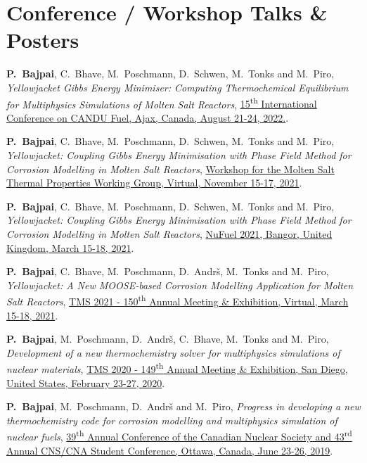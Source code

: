 \section*{Conference / Workshop Talks \& Posters}
\vspace*{1em}
\begin{enumerate}{\small\compresslist
    \item \textbf{P.\ Bajpai}, {C.\ Bhave}, {M.\ Poschmann}, {D.\ Schwen}, {M.\ Tonks} and {M.\ Piro}, \textit{Yellowjacket Gibbs Energy Minimiser: Computing Thermochemical Equilibrium for Multiphysics Simulations of Molten Salt Reactors}, \href{https://www.cns-snc.ca/event/2022-fuel-conference/}{15\textsuperscript{th} International Conference on CANDU Fuel, Ajax, Canada, August 21-24, 2022.}.
    \item \textbf{P.\ Bajpai}, {C.\ Bhave}, {M.\ Poschmann}, {D.\ Schwen}, {M.\ Tonks} and {M.\ Piro}, \textit{Yellowjacket: Coupling Gibbs Energy Minimisation with Phase Field Method for Corrosion Modelling in Molten Salt Reactors}, \href{}{Workshop for the Molten Salt Thermal Properties Working Group, Virtual, November 15-17, 2021}.
    \item \textbf{P.\ Bajpai}, {C.\ Bhave}, {M.\ Poschmann}, {D.\ Schwen}, {M.\ Tonks} and {M.\ Piro}, \textit{Yellowjacket: Coupling Gibbs Energy Minimisation with Phase Field Method for Corrosion Modelling in Molten Salt Reactors}, \href{https://nubu.nu/events/nufuel-workshop/}{NuFuel 2021, Bangor, United Kingdom, March 15-18, 2021}.
    \item \textbf{P.\ Bajpai}, {C.\ Bhave}, {M.\ Poschmann}, {D.\ Andr\v{s}}, {M.\ Tonks} and {M.\ Piro}, \textit{Yellowjacket: A New MOOSE‐based Corrosion Modelling Application for Molten Salt Reactors}, \href{https://www.tms.org/TMS2021}{TMS 2021  - 150\textsuperscript{th} Annual Meeting \& Exhibition, Virtual, March 15-18, 2021}.
    \item \textbf{P.\ Bajpai}, {M.\ Poschmann}, {D.\ Andr\v{s}}, {C.\ Bhave}, {M.\ Tonks} and {M.\ Piro}, \textit{Development of a new thermochemistry solver for multiphysics simulations of nuclear materials}, \href{https://www.tms.org/TMS2020}{TMS 2020  - 149\textsuperscript{th} Annual Meeting \& Exhibition, San Diego, United States, February 23-27, 2020}.
    \item \textbf{P.\ Bajpai}, {M.\ Poschmann}, {D.\ Andr\v{s}} and {M.\ Piro}, \textit{Progress in developing a new thermochemistry code for corrosion modelling and multiphysics simulation of nuclear fuels}, \href{http://cns-annual-conference.org/2019/index.html}{39\textsuperscript{th} Annual Conference of the Canadian Nuclear Society and 43\textsuperscript{rd} Annual CNS/CNA Student Conference, Ottawa, Canada, June 23-26, 2019}.
}
\end{enumerate}


